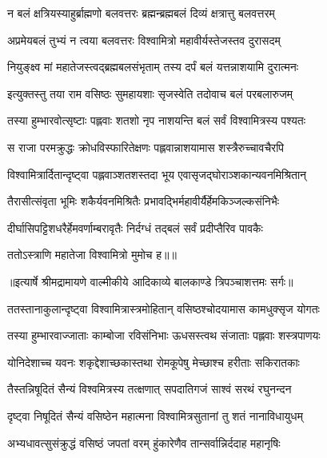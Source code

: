 \twolineshloka
{न बलं क्षत्रियस्याहुर्ब्राह्मणो बलवत्तरः}
{ब्रह्मन्ब्रह्मबलं दिव्यं क्षत्रात्तु बलवत्तरम्} %

\twolineshloka
{अप्रमेयबलं तुभ्यं न त्वया बलवत्तरः}
{विश्वामित्रो महावीर्यस्तेजस्तव दुरासदम्} %

\twolineshloka
{नियुङ्क्ष्व मां महातेजस्त्वद्ब्रह्मबलसंभृताम्}
{तस्य दर्पं बलं यत्तन्नाशयामि दुरात्मनः} %

\twolineshloka
{इत्युक्तस्तु तया राम वसिष्ठः सुमहायशाः}
{सृजस्वेति तदोवाच बलं परबलारुजम्} %

\twolineshloka
{तस्या हुम्भारवोत्सृष्टाः पह्लवाः शतशो नृप}
{नाशयन्ति बलं सर्वं विश्वामित्रस्य पश्यतः} %

\twolineshloka
{स राजा परमक्रुद्धः क्रोधविस्फारितेक्षणः}
{पह्लवान्नाशयामास शस्त्रैरुच्चावचैरपि} %

\twolineshloka
{विश्वामित्रार्दितान्दृष्ट्वा पह्लवाञ्शतशस्तदा}
{भूय एवासृजद्घोराञ्शकान्यवनमिश्रितान्} %

\twolineshloka
{तैरासीत्संवृता भूमिः शकैर्यवनमिश्रितैः}
{प्रभावद्भिर्महावीर्यैर्हेमकिञ्जल्कसंनिभैः} %

\twolineshloka
{दीर्घासिपट्टिशधरैर्हेमवर्णाम्बरावृतैः}
{निर्दग्धं तद्बलं सर्वं प्रदीप्तैरिव पावकैः} %

{ततोऽस्त्राणि महातेजा विश्वामित्रो मुमोच ह॥॥} %

\addtocounter{shlokacount}{1}


{॥इत्यार्षे श्रीमद्रामायणे वाल्मीकीये आदिकाव्ये बालकाण्डे त्रिपञ्चाशत्तमः सर्गः॥}


\twolineshloka
{ततस्तानाकुलान्दृष्ट्वा विश्वामित्रास्त्रमोहितान्}
{वसिष्ठश्चोदयामास कामधुक्सृज योगतः} %

\twolineshloka
{तस्या हुम्भारवाज्जाताः काम्बोजा रविसंनिभाः}
{ऊधसस्त्वथ संजाताः पह्लवाः शस्त्रपाणयः} %

\twolineshloka
{योनिदेशाच्च यवनः शकृद्देशाच्छकास्तथा}
{रोमकूपेषु मेच्छाश्च हरीताः सकिरातकाः} %

\twolineshloka
{तैस्तन्निषूदितं सैन्यं विश्वमित्रस्य तत्क्षणात्}
{सपदातिगजं साश्वं सरथं रघुनन्दन} %

\twolineshloka
{दृष्ट्वा निषूदितं सैन्यं वसिष्ठेन महात्मना}
{विश्वामित्रसुतानां तु शतं नानाविधायुधम्} %

\twolineshloka
{अभ्यधावत्सुसंक्रुद्धं वसिष्ठं जपतां वरम्}
{हुंकारेणैव तान्सर्वान्निर्ददाह महानृषिः} %

